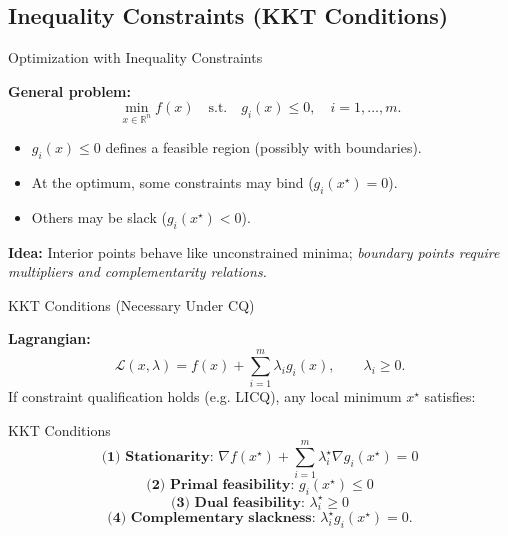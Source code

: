 \documentclass[aspectratio=169]{beamer}
\begin{document}
\subsection{Inequality Constraints (KKT Conditions)}

\begin{frame}{Optimization with Inequality Constraints}

\textbf{General problem:}
\[
\min_{x\in\mathbb{R}^n} f(x)
\quad\text{s.t.}\quad 
g_i(x)\le 0,\quad i=1,\ldots,m.
\]
  \pause
\begin{itemize}
  \item \(g_i(x)\le 0\) defines a feasible region (possibly with boundaries).
  \item At the optimum, some constraints may bind (\(g_i(x^\star)=0\)).
  \item Others may be slack (\(g_i(x^\star)<0\)).
\end{itemize}
  \pause
\textbf{Idea:}  
Interior points behave like unconstrained minima;  
\emph{boundary points require multipliers and complementarity relations.}

\end{frame}

\begin{frame}{KKT Conditions (Necessary Under CQ)}

\textbf{Lagrangian:}
\[
\mathcal{L}(x,\lambda)
=
f(x)+\sum_{i=1}^m \lambda_i g_i(x),
\qquad \lambda_i\ge 0.
\]
  \pause
If constraint qualification holds (e.g. LICQ), any local minimum \(x^\star\) satisfies:
  \pause
\begin{block}{KKT Conditions}
\[
\textbf{(1) Stationarity: } 
\nabla f(x^\star)+\sum_{i=1}^m\lambda_i^\star\nabla g_i(x^\star)=0
\]
\[
\textbf{(2) Primal feasibility: }
g_i(x^\star)\le 0
\]
\[
\textbf{(3) Dual feasibility: }
\lambda_i^\star\ge 0
\]
\[
\textbf{(4) Complementary slackness: } 
\lambda_i^\star g_i(x^\star)=0.
\]
\end{block}
  \pause
\end{frame}
\end{document}
